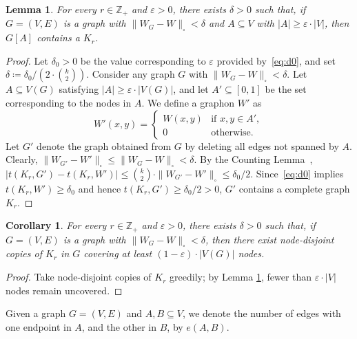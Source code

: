 \documentclass[10pt]{article}
\theoremstyle{plain}
\newtheorem{lem}[thm]{Lemma}
\newtheorem{cor}[thm]{Corollary}
\theoremstyle{definition}
\newcommand{\bbZ}{\mathbb{Z}}
\begin{document}
\begin{lem}\label{LEM:COVER-BY-SMALL-Kk}
    For every $r\in\bbZ_+$ and $\varepsilon>0$, there exists $\delta>0$ such that, if $G=(V,E)$ is a graph with $\|W_G-W\|_\square<\delta$ and $A\subseteq V$ with $|A|\ge \varepsilon\cdot |V|$, then $G[A]$ contains a $K_r$. 
\end{lem}
\begin{proof} 
    Let $\delta_0>0$ be the value corresponding to $\varepsilon$ provided by~\eqref{eq:d0}, and set $\delta\coloneqq \delta_0/(2\cdot \binom{k}{2})$. Consider any graph $G$ with $\|W_G-W\|_{\square}<\delta$. Let $A\subseteq V(G)$ satisfying $|A|\ge\varepsilon\cdot |V(G)|$, and let $A'\subseteq[0,1]$ be the set corresponding to the nodes in $A$. 
    We define a graphon $W'$ as
    \[
    W'(x,y)=\begin{cases}
        W(x,y) &\text{if $x,y\in A'$},\\
        0& \text{otherwise}.
    \end{cases}
    \]
    Let $G'$ denote the graph obtained from $G$ by deleting all edges not spanned by $A$. Clearly, $\|W_{G'}-W'\|_\square\le \|W_{G}-W\|_{\square}< \delta$. By the Counting Lemma~\cite[Lemma 10.23]{lovasz2012large}, 
    $|t(K_r,G')-t(K_r,W')|\le \binom{k}{2}\cdot \|W_{G'}-W'\|_\square\le \delta_0/2.$
     Since~\eqref{eq:d0} implies $t(K_r,W')\geq\delta_0$ and hence $t(K_r,G')\ge\delta_0/2>0$, $G'$ contains a complete graph $K_r$.
\end{proof}

\begin{cor}\label{COR:COVER-BY-SMALL-Kk}
For every $r\in\bbZ_+$ and $\varepsilon>0$, there exists $\delta>0$ such that, if $G=(V,E)$ is a graph with $\|W_G-W\|_\square<\delta$, then there exist node-disjoint copies of $K_r$ in $G$ covering at least $(1-\varepsilon)\cdot|V(G)|$ nodes.
\end{cor}
\begin{proof}
Take node-disjoint copies of $K_r$ greedily; by Lemma \ref{LEM:COVER-BY-SMALL-Kk}, fewer than $\varepsilon\cdot |V|$ nodes remain uncovered.
\end{proof}

Given a graph $G=(V,E)$ and $A,B\subseteq V$, we denote the number of edges with one endpoint in $A$, and the other in $B$, by $e(A,B)$. 
\end{document}
